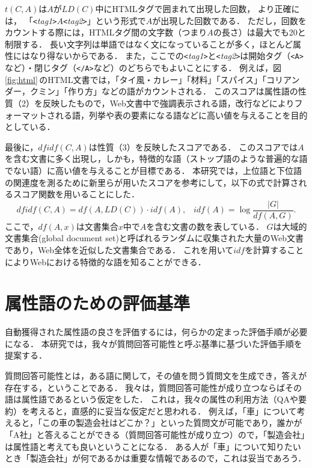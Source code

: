 $t(C,A)$は$A$が$LD(C)$中にHTMLタグで囲まれて出現した回数，
より正確には，\linebreak
「\verb!<!{\it tag1}\verb!>!$A$\verb!<!{\it tag2}\verb!>!」という形式で$A$が出現した回数である． ただし，回数をカウントする際には，HTMLタグ間の文字数（つまり$A$の長さ）は最大でも20と制限する． 
長い文字列は単語ではなく文になっていることが多く，ほとんど属性にはなり得ないからである．
また，ここでの\verb!<!{\it tag1}\verb!>!と\verb!<!{\it tag2}\verb!>!は開始タグ（\verb!<A>!など）・閉じタグ（\verb!</A>!など）のどちらでもよいことにする．
例えば，図\ref{fig:html}\,のHTML文書では，「タイ風・カレー」「材料」「スパイス」「コリアンダー，クミン」「作り方」などの語がカウントされる． 
このスコアは属性語の性質（2）を反映したもので，Web文書中で強調表示される語，改行などによりフォーマットされる語，列挙や表の要素になる語などに高い値を与えることを目的としている．

最後に，$dfidf(C,A)$は性質（3）を反映したスコアである．
このスコアでは$A$を含む文書に多く出現し，しかも，特徴的な語（ストップ語のような普遍的な語でない語）に高い値を与えることが目標である．
本研究では，上位語と下位語の関連度を測るために新里ら\cite{Shinzato_2004_NAACL04_eng}が用いたスコアを参考にして，以下の式で計算されるスコア関数を用いることにした．
\[
 dfidf(C,A) = df(A,LD(C)) \cdot idf(A), \;\;\;idf(A) = \log {\frac{|G|}{df(A,G)}}.
\]
ここで，$df(A,x)$は文書集合$x$中で$A$を含む文書の数を表している．
$G$は大域的文書集合(global document set)と呼ばれるランダムに収集された大量のWeb文書であり，Web全体を近似した文書集合である．
これを用いて$idf$を計算することによりWebにおける特徴的な語を知ることができる．

\clearpage
\section{属性語のための評価基準}
\label{sec:criteria}
自動獲得された属性語の良さを評価するには，何らかの定まった評価手順が必要になる．
本研究では，我々が質問回答可能性と呼ぶ基準に基づいた評価手順を提案する． 

質問回答可能性とは，ある語に関して，その値を問う質問文を生成でき，答えが存在する，ということである．
我々は，質問回答可能性が成り立つならばその語は属性語であるという仮定をした． 
これは，我々の属性の利用方法（QAや要約）を考えると，直感的に妥当な仮定だと思われる．
例えば，「車」について考えると，「この車の製造会社はどこか？」といった質問文が可能であり，誰かが「A社」と答えることができる（質問回答可能性が成り立つ）ので，「製造会社」は属性語と考えても良いということになる．
ある人が「車」について知りたいとき「製造会社」が何であるかは重要な情報であるので，これは妥当であろう．

